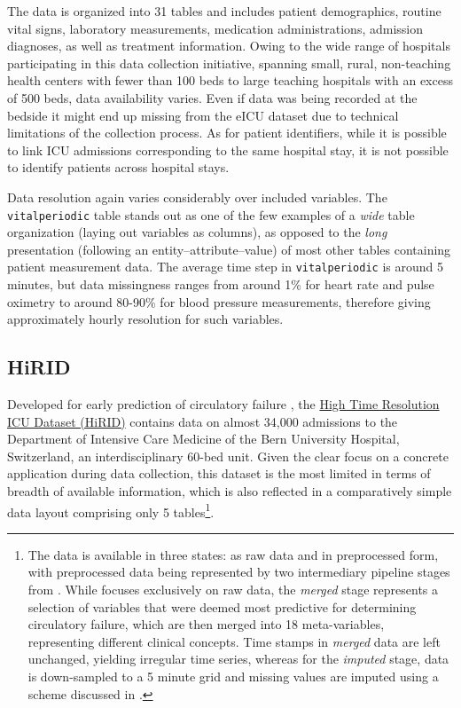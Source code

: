 \documentclass[
  notitle]{jss}
\begin{document}
The data is organized into 31 tables and includes patient demographics,
routine vital signs, laboratory measurements, medication
administrations, admission diagnoses, as well as treatment information.
Owing to the wide range of hospitals participating in this data
collection initiative, spanning small, rural, non-teaching health
centers with fewer than 100 beds to large teaching hospitals with an
excess of 500 beds, data availability varies. Even if data was being
recorded at the bedside it might end up missing from the eICU dataset
due to technical limitations of the collection process. As for patient
identifiers, while it is possible to link ICU admissions corresponding
to the same hospital stay, it is not possible to identify patients
across hospital stays.

Data resolution again varies considerably over included variables. The
\texttt{vitalperiodic} table stands out as one of the few examples of a
\emph{wide} table organization (laying out variables as columns), as
opposed to the \emph{long} presentation (following an
entity--attribute--value) of most other tables containing patient
measurement data. The average time step in \texttt{vitalperiodic} is
around 5 minutes, but data missingness ranges from around 1\% for heart
rate and pulse oximetry to around 80-90\% for blood pressure
measurements, therefore giving approximately hourly resolution for such
variables.

\hypertarget{hirid}{%
\subsection{HiRID}\label{hirid}}

Developed for early prediction of circulatory failure
\citep{hyland2020}, the
\href{https://physionet.org/content/hirid/1.0/}{High Time Resolution ICU
Dataset (HiRID)} contains data on almost 34,000 admissions to the
Department of Intensive Care Medicine of the Bern University Hospital,
Switzerland, an interdisciplinary 60-bed unit. Given the clear focus on
a concrete application during data collection, this dataset is the most
limited in terms of breadth of available information, which is also
reflected in a comparatively simple data layout comprising only 5
tables\footnote{The data is available in three states: as raw data and
  in preprocessed form, with preprocessed data being represented by two
  intermediary pipeline stages from \citep{hyland2020}. While 
  focuses exclusively on raw data, the \emph{merged} stage represents a
  selection of variables that were deemed most predictive for
  determining circulatory failure, which are then merged into 18
  meta-variables, representing different clinical concepts. Time stamps
  in \emph{merged} data are left unchanged, yielding irregular time
  series, whereas for the \emph{imputed} stage, data is down-sampled to
  a 5 minute grid and missing values are imputed using a scheme
  discussed in \citep{hyland2020}.}.
\end{document}
